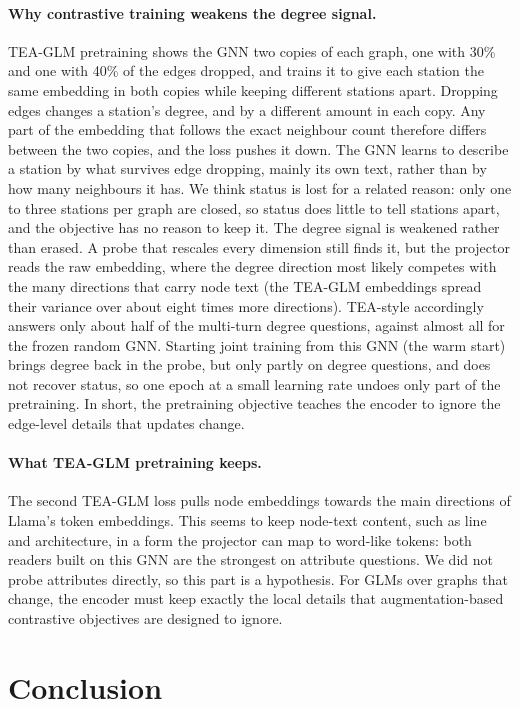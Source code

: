 \documentclass[11pt]{article}
\begin{document}
\paragraph{Why contrastive training weakens the degree signal.}
TEA-GLM pretraining shows the GNN two copies of each graph, one with 30\% and one with 40\% of the edges dropped, and trains it to give each station the same embedding in both copies while keeping different stations apart.
Dropping edges changes a station's degree, and by a different amount in each copy.
Any part of the embedding that follows the exact neighbour count therefore differs between the two copies, and the loss pushes it down.
The GNN learns to describe a station by what survives edge dropping, mainly its own text, rather than by how many neighbours it has.
We think status is lost for a related reason: only one to three stations per graph are closed, so status does little to tell stations apart, and the objective has no reason to keep it.
The degree signal is weakened rather than erased.
A probe that rescales every dimension still finds it, but the projector reads the raw embedding, where the degree direction most likely competes with the many directions that carry node text (the TEA-GLM embeddings spread their variance over about eight times more directions).
TEA-style accordingly answers only about half of the multi-turn degree questions, against almost all for the frozen random GNN.
Starting joint training from this GNN (the warm start) brings degree back in the probe, but only partly on degree questions, and does not recover status, so one epoch at a small learning rate undoes only part of the pretraining.
In short, the pretraining objective teaches the encoder to ignore the edge-level details that updates change.

\paragraph{What TEA-GLM pretraining keeps.}
The second TEA-GLM loss pulls node embeddings towards the main directions of Llama's token embeddings.
This seems to keep node-text content, such as line and architecture, in a form the projector can map to word-like tokens: both readers built on this GNN are the strongest on attribute questions.
We did not probe attributes directly, so this part is a hypothesis.
For GLMs over graphs that change, the encoder must keep exactly the local details that augmentation-based contrastive objectives are designed to ignore.

\section{Conclusion}
\label{sec:conclusion}
\end{document}
